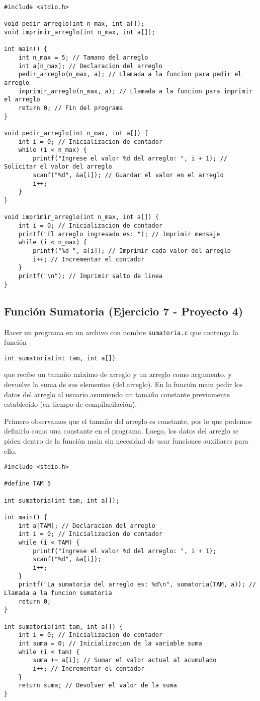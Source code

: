 \documentclass{article}
\begin{document}
\begin{verbatim}
#include <stdio.h>

void pedir_arreglo(int n_max, int a[]);
void imprimir_arreglo(int n_max, int a[]);

int main() {
    int n_max = 5; // Tamano del arreglo
    int a[n_max]; // Declaracion del arreglo
    pedir_arreglo(n_max, a); // Llamada a la funcion para pedir el arreglo
    imprimir_arreglo(n_max, a); // Llamada a la funcion para imprimir el arreglo
    return 0; // Fin del programa
}

void pedir_arreglo(int n_max, int a[]) {
    int i = 0; // Inicializacion de contador
    while (i < n_max) {
        printf("Ingrese el valor %d del arreglo: ", i + 1); // Solicitar el valor del arreglo
        scanf("%d", &a[i]); // Guardar el valor en el arreglo
        i++;
    }
}

void imprimir_arreglo(int n_max, int a[]) {
    int i = 0; // Inicializacion de contador
    printf("El arreglo ingresado es: "); // Imprimir mensaje
    while (i < n_max) { 
        printf("%d ", a[i]); // Imprimir cada valor del arreglo
        i++; // Incrementar el contador
    }
    printf("\n"); // Imprimir salto de linea
}
\end{verbatim}

\newpage
\subsection{Función Sumatoria (Ejercicio 7 - Proyecto 4)}
Hacer un programa en un archivo con nombre \texttt{sumatoria.c} que contenga la función
\begin{verbatim}
int sumatoria(int tam, int a[])
\end{verbatim}
que recibe un tamaño máximo de arreglo y un arreglo como argumento, y devuelve la suma de sus elementos (del arreglo). En la función main pedir los datos del arreglo al usuario asumiendo un tamaño constante previamente establecido (en tiempo de compilacilación).

Primero observamos que el tamaño del arreglo es constante, por lo que podemos definirlo como una constante en el programa. Luego, los datos del arreglo se piden dentro de la función main sin necesidad de usar funciones auxiliares para ello.
\begin{verbatim}
#include <stdio.h>

#define TAM 5

int sumatoria(int tam, int a[]);

int main() {
    int a[TAM]; // Declaracion del arreglo
    int i = 0; // Inicializacion de contador
    while (i < TAM) {
        printf("Ingrese el valor %d del arreglo: ", i + 1);
        scanf("%d", &a[i]);
        i++;
    }
    printf("La sumatoria del arreglo es: %d\n", sumatoria(TAM, a)); // Llamada a la funcion sumatoria
    return 0;
}

int sumatoria(int tam, int a[]) {
    int i = 0; // Inicializacion de contador
    int suma = 0; // Inicializacion de la variable suma
    while (i < tam) {
        suma += a[i]; // Sumar el valor actual al acumulado
        i++; // Incrementar el contador
    }
    return suma; // Devolver el valor de la suma
}
\end{verbatim}
\end{document}
